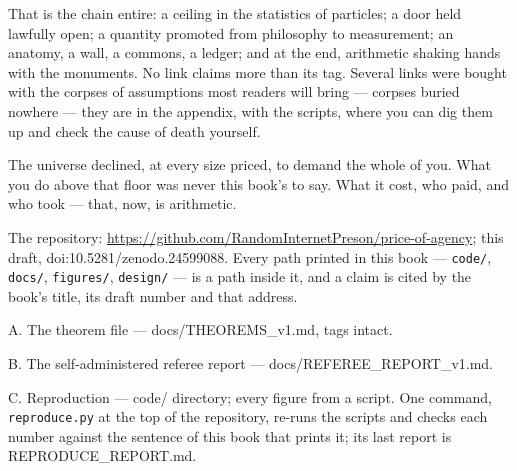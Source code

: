 That is the chain entire: a ceiling in the statistics of particles;
a door held lawfully open; a quantity promoted from philosophy to
measurement; an anatomy, a wall, a commons, a ledger; and at the end,
arithmetic shaking hands with the monuments. No link claims more
than its tag. Several links were bought with the corpses of assumptions
most readers will bring --- corpses buried nowhere --- they are in the appendix,
with the scripts, where you can dig them up and check the cause of
death yourself.

The universe declined, at every size priced, to demand the whole of
you. What you do above that floor was never this book's to say. What it cost, who paid, and who took --- that, now, is
arithmetic.


\begin{receipts}{}

\setlength{\parskip}{7pt}\setlength{\parindent}{0pt}

\noindent{}The repository: \url{https://github.com/RandomInternetPreson/price-of-agency}; this draft, doi:10.\allowbreak{}5281/\allowbreak{}zenodo.\allowbreak{}24599088. Every path printed in this book --- \texttt{code/\allowbreak{}}, \texttt{docs/\allowbreak{}}, \texttt{figures/\allowbreak{}}, \texttt{design/\allowbreak{}} --- is a path inside it, and a claim is cited by the book's title, its draft number and that address.

A. The theorem file --- docs/\allowbreak{}THEOREMS\_\allowbreak{}v1.\allowbreak{}md, tags intact.

B. The self-administered referee report --- docs/\allowbreak{}REFEREE\_\allowbreak{}REPORT\_\allowbreak{}v1.\allowbreak{}md.

C. Reproduction --- code/ directory; every figure from a script. One command, \texttt{reproduce.\allowbreak{}py} at the top of the repository, re-runs the scripts and checks each number against the sentence of this book that prints it; its last report is REPRODUCE\_\allowbreak{}REPORT.\allowbreak{}md.


\end{receipts}

